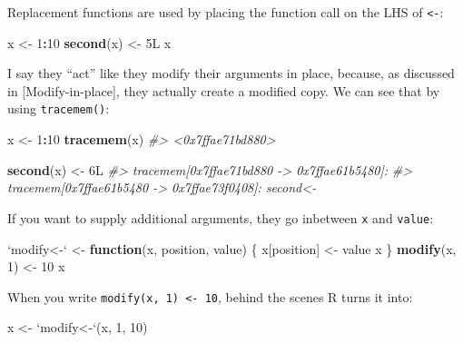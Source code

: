 \documentclass[]{book}
\newenvironment{Shaded}{\begin{snugshade}}{\end{snugshade}}
\newcommand{\CommentTok}[1]{\textcolor[rgb]{0.56,0.35,0.01}{\textit{#1}}}
\newcommand{\ControlFlowTok}[1]{\textcolor[rgb]{0.13,0.29,0.53}{\textbf{#1}}}
\newcommand{\DataTypeTok}[1]{\textcolor[rgb]{0.13,0.29,0.53}{#1}}
\newcommand{\DecValTok}[1]{\textcolor[rgb]{0.00,0.00,0.81}{#1}}
\newcommand{\KeywordTok}[1]{\textcolor[rgb]{0.13,0.29,0.53}{\textbf{#1}}}
\newcommand{\NormalTok}[1]{#1}
\newcommand{\OperatorTok}[1]{\textcolor[rgb]{0.81,0.36,0.00}{\textbf{#1}}}
\newcommand{\StringTok}[1]{\textcolor[rgb]{0.31,0.60,0.02}{#1}}
\theoremstyle{definition}
\theoremstyle{definition}
\theoremstyle{definition}
\theoremstyle{remark}
\begin{document}
Replacement functions are used by placing the function call on the LHS
of \texttt{\textless{}-}:

\begin{Shaded}
\begin{Highlighting}[]
\NormalTok{x <-}\StringTok{ }\DecValTok{1}\OperatorTok{:}\DecValTok{10}
\KeywordTok{second}\NormalTok{(x) <-}\StringTok{ }\NormalTok{5L}
\NormalTok{x}
\end{Highlighting}
\end{Shaded}

I say they ``act'' like they modify their arguments in place, because,
as discussed in {[}Modify-in-place{]}, they actually create a modified
copy. We can see that by using \texttt{tracemem()}:

\begin{Shaded}
\begin{Highlighting}[]
\NormalTok{x <-}\StringTok{ }\DecValTok{1}\OperatorTok{:}\DecValTok{10}
\KeywordTok{tracemem}\NormalTok{(x)}
\CommentTok{#> <0x7ffae71bd880>}

\KeywordTok{second}\NormalTok{(x) <-}\StringTok{ }\NormalTok{6L}
\CommentTok{#> tracemem[0x7ffae71bd880 -> 0x7ffae61b5480]: }
\CommentTok{#> tracemem[0x7ffae61b5480 -> 0x7ffae73f0408]: second<- }
\end{Highlighting}
\end{Shaded}

If you want to supply additional arguments, they go inbetween \texttt{x}
and \texttt{value}:

\begin{Shaded}
\begin{Highlighting}[]
\StringTok{`}\DataTypeTok{modify<-}\StringTok{`}\NormalTok{ <-}\StringTok{ }\ControlFlowTok{function}\NormalTok{(x, position, value) \{}
\NormalTok{  x[position] <-}\StringTok{ }\NormalTok{value}
\NormalTok{  x}
\NormalTok{\}}
\KeywordTok{modify}\NormalTok{(x, }\DecValTok{1}\NormalTok{) <-}\StringTok{ }\DecValTok{10}
\NormalTok{x}
\end{Highlighting}
\end{Shaded}

When you write \texttt{modify(x,\ 1)\ \textless{}-\ 10}, behind the
scenes R turns it into:

\begin{Shaded}
\begin{Highlighting}[]
\NormalTok{x <-}\StringTok{ `}\DataTypeTok{modify<-}\StringTok{`}\NormalTok{(x, }\DecValTok{1}\NormalTok{, }\DecValTok{10}\NormalTok{)}
\end{Highlighting}
\end{Shaded}
\end{document}
